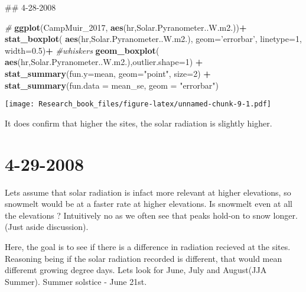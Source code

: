 \documentclass[]{book}
\newenvironment{Shaded}{\begin{snugshade}}{\end{snugshade}}
\newcommand{\KeywordTok}[1]{\textcolor[rgb]{0.13,0.29,0.53}{\textbf{#1}}}
\newcommand{\DataTypeTok}[1]{\textcolor[rgb]{0.13,0.29,0.53}{#1}}
\newcommand{\DecValTok}[1]{\textcolor[rgb]{0.00,0.00,0.81}{#1}}
\newcommand{\FloatTok}[1]{\textcolor[rgb]{0.00,0.00,0.81}{#1}}
\newcommand{\StringTok}[1]{\textcolor[rgb]{0.31,0.60,0.02}{#1}}
\newcommand{\CommentTok}[1]{\textcolor[rgb]{0.56,0.35,0.01}{\textit{#1}}}
\newcommand{\OperatorTok}[1]{\textcolor[rgb]{0.81,0.36,0.00}{\textbf{#1}}}
\newcommand{\NormalTok}[1]{#1}
\theoremstyle{definition}
\theoremstyle{definition}
\theoremstyle{definition}
\theoremstyle{remark}
\begin{document}
\begin{Shaded}
\begin{Highlighting}[]
\NormalTok{## 4-28-2008}

\CommentTok{#}
\KeywordTok{ggplot}\NormalTok{(CampMuir_}\DecValTok{2017}\NormalTok{, }\KeywordTok{aes}\NormalTok{(hr,Solar.Pyranometer..W.m2.))}\OperatorTok{+}
\StringTok{  }\KeywordTok{stat_boxplot}\NormalTok{( }\KeywordTok{aes}\NormalTok{(hr,Solar.Pyranometer..W.m2.), }
    \DataTypeTok{geom=}\StringTok{'errorbar'}\NormalTok{, }\DataTypeTok{linetype=}\DecValTok{1}\NormalTok{, }\DataTypeTok{width=}\FloatTok{0.5}\NormalTok{)}\OperatorTok{+}\StringTok{  }\CommentTok{#whiskers}
\StringTok{  }\KeywordTok{geom_boxplot}\NormalTok{( }\KeywordTok{aes}\NormalTok{(hr,Solar.Pyranometer..W.m2.),}\DataTypeTok{outlier.shape=}\DecValTok{1}\NormalTok{) }\OperatorTok{+}\StringTok{    }
\StringTok{  }\KeywordTok{stat_summary}\NormalTok{(}\DataTypeTok{fun.y=}\NormalTok{mean, }\DataTypeTok{geom=}\StringTok{"point"}\NormalTok{, }\DataTypeTok{size=}\DecValTok{2}\NormalTok{) }\OperatorTok{+}\StringTok{ }
\StringTok{  }\KeywordTok{stat_summary}\NormalTok{(}\DataTypeTok{fun.data =}\NormalTok{ mean_se, }\DataTypeTok{geom =} \StringTok{"errorbar"}\NormalTok{)}
\end{Highlighting}
\end{Shaded}

\texttt{[image: Research\_book\_files/figure-latex/unnamed-chunk-9-1.pdf]}

It does confirm that higher the sites, the solar radiation is slightly
higher.

\section{4-29-2008}\label{section-4}

Lets assume that solar radiation is infact more relevant at higher
elevations, so snowmelt would be at a faster rate at higher elevations.
Is snowmelt even at all the elevations ? Intuitively no as we often see
that peaks hold-on to snow longer. (Just aside discussion).

Here, the goal is to see if there is a difference in radiation recieved
at the sites. Reasoning being if the solar radiation recorded is
different, that would mean differemt growing degree days. Lets look for
June, July and August(JJA Summer). Summer solstice - June 21st.
\end{document}

